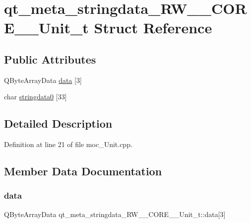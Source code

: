 \hypertarget{structqt__meta__stringdata___r_w_____c_o_r_e_____unit__t}{}\section{qt\+\_\+meta\+\_\+stringdata\+\_\+\+R\+W\+\_\+\+\_\+\+C\+O\+R\+E\+\_\+\+\_\+\+Unit\+\_\+t Struct Reference}
\label{structqt__meta__stringdata___r_w_____c_o_r_e_____unit__t}
\subsection*{Public Attributes}
\begin{DoxyCompactItemize}
\item 
Q\+Byte\+Array\+Data \hyperlink{structqt__meta__stringdata___r_w_____c_o_r_e_____unit__t_a1d952a366d46d3eb215df421b39652fc}{data} \mbox{[}3\mbox{]}
\item 
char \hyperlink{structqt__meta__stringdata___r_w_____c_o_r_e_____unit__t_aa2fe6b0b151b388dcd58fd8c0b60edfd}{stringdata0} \mbox{[}33\mbox{]}
\end{DoxyCompactItemize}


\subsection{Detailed Description}


Definition at line 21 of file moc\+\_\+\+Unit.\+cpp.



\subsection{Member Data Documentation}
\hypertarget{structqt__meta__stringdata___r_w_____c_o_r_e_____unit__t_a1d952a366d46d3eb215df421b39652fc}{}\label{structqt__meta__stringdata___r_w_____c_o_r_e_____unit__t_a1d952a366d46d3eb215df421b39652fc} 
\subsubsection{\texorpdfstring{data}{data}}
{\footnotesize\ttfamily Q\+Byte\+Array\+Data qt\+\_\+meta\+\_\+stringdata\+\_\+\+R\+W\+\_\+\+\_\+\+C\+O\+R\+E\+\_\+\+\_\+\+Unit\+\_\+t\+::data\mbox{[}3\mbox{]}}



